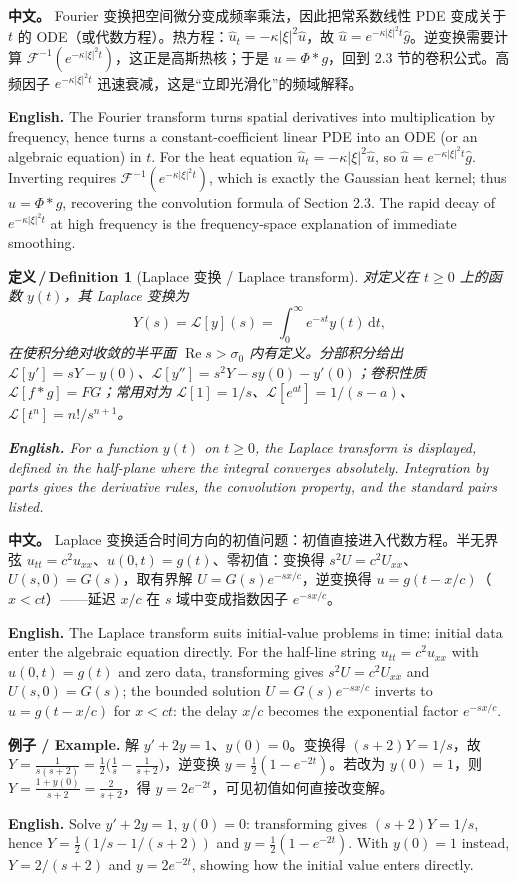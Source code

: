 \documentclass[UTF8,11pt,a4paper]{ctexart}
\newcommand{\APS}[2]{\par\noindent\textbf{中文。} #1\par\noindent\textbf{English.} #2\par\smallskip}
\newcommand{\EN}[1]{\par\noindent \textbf{English.} #1\par}
\newcommand{\EX}[2]{\par\noindent \textbf{例子 / Example.} #1\par\EN{#2}}
\newtheorem{definition}{定义\,/\,Definition}[section]
\newcommand{\dd}{\mathrm{d}}
\begin{document}
\APS{Fourier 变换把空间微分变成频率乘法，因此把常系数线性 PDE 变成关于 $t$ 的 ODE（或代数方程）。热方程：$\widehat u_t=-\kappa|\xi|^2\widehat u$，故 $\widehat u=e^{-\kappa|\xi|^2t}\widehat g$。逆变换需要计算 $\mathcal F^{-1}(e^{-\kappa|\xi|^2t})$，这正是高斯热核；于是 $u=\Phi*g$，回到 2.3 节的卷积公式。高频因子 $e^{-\kappa|\xi|^2t}$ 迅速衰减，这是``立即光滑化''的频域解释。}{The Fourier transform turns spatial derivatives into multiplication by frequency, hence turns a constant-coefficient linear PDE into an ODE (or an algebraic equation) in $t$. For the heat equation $\widehat u_t=-\kappa|\xi|^2\widehat u$, so $\widehat u=e^{-\kappa|\xi|^2t}\widehat g$. Inverting requires $\mathcal F^{-1}(e^{-\kappa|\xi|^2t})$, which is exactly the Gaussian heat kernel; thus $u=\Phi*g$, recovering the convolution formula of Section 2.3. The rapid decay of $e^{-\kappa|\xi|^2t}$ at high frequency is the frequency-space explanation of immediate smoothing.}

\begin{definition}[Laplace 变换 / Laplace transform]\label{def:laplace}
对定义在 $t\ge0$ 上的函数 $y(t)$，其 Laplace 变换为
\[
Y(s)=\mathcal L[y](s)=\int_0^\infty e^{-st}y(t)\,\dd t,
\]
在使积分绝对收敛的半平面 $\operatorname{Re}s>\sigma_0$ 内有定义。分部积分给出 $\mathcal L[y']=sY-y(0)$、$\mathcal L[y'']=s^2Y-sy(0)-y'(0)$；卷积性质 $\mathcal L[f*g]=FG$；常用对为 $\mathcal L[1]=1/s$、$\mathcal L[e^{at}]=1/(s-a)$、$\mathcal L[t^n]=n!/s^{n+1}$。
\EN{For a function $y(t)$ on $t\ge0$, the Laplace transform is displayed, defined in the half-plane where the integral converges absolutely. Integration by parts gives the derivative rules, the convolution property, and the standard pairs listed.}
\end{definition}

\APS{Laplace 变换适合时间方向的初值问题：初值直接进入代数方程。半无界弦 $u_{tt}=c^2u_{xx}$、$u(0,t)=g(t)$、零初值：变换得 $s^2U=c^2U_{xx}$、$U(s,0)=G(s)$，取有界解 $U=G(s)e^{-sx/c}$，逆变换得 $u=g(t-x/c)$（$x<ct$）——延迟 $x/c$ 在 $s$ 域中变成指数因子 $e^{-sx/c}$。}{The Laplace transform suits initial-value problems in time: initial data enter the algebraic equation directly. For the half-line string $u_{tt}=c^2u_{xx}$ with $u(0,t)=g(t)$ and zero data, transforming gives $s^2U=c^2U_{xx}$ and $U(s,0)=G(s)$; the bounded solution $U=G(s)e^{-sx/c}$ inverts to $u=g(t-x/c)$ for $x<ct$: the delay $x/c$ becomes the exponential factor $e^{-sx/c}$.}

\EX{解 $y'+2y=1$、$y(0)=0$。变换得 $(s+2)Y=1/s$，故 $Y=\frac{1}{s(s+2)}=\frac12\bigl(\frac1s-\frac1{s+2}\bigr)$，逆变换 $y=\frac12(1-e^{-2t})$。若改为 $y(0)=1$，则 $Y=\frac{1+y(0)}{s+2}=\frac{2}{s+2}$，得 $y=2e^{-2t}$，可见初值如何直接改变解。}{Solve $y'+2y=1$, $y(0)=0$: transforming gives $(s+2)Y=1/s$, hence $Y=\frac12(1/s-1/(s+2))$ and $y=\frac12(1-e^{-2t})$. With $y(0)=1$ instead, $Y=2/(s+2)$ and $y=2e^{-2t}$, showing how the initial value enters directly.}
\end{document}
